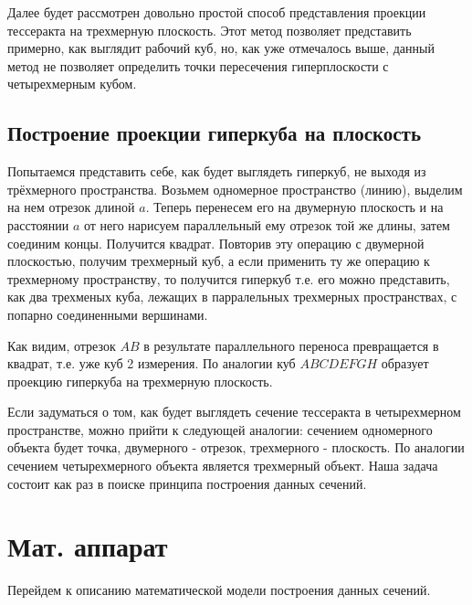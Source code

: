 \documentclass[12pt, a4paper, twoside]{report}
\begin{document}
Далее будет рассмотрен довольно простой способ представления проекции тессеракта на трехмерную плоскость. Этот метод позволяет представить примерно, как выглядит рабочий куб, но, как уже отмечалось выше, данный метод не позволяет определить точки пересечения гиперплоскости с четырехмерным кубом.
\subsection{Построение проекции гиперкуба на плоскость}
Попытаемся представить себе, как будет выглядеть гиперкуб, не выходя из трёхмерного пространства. Возьмем одномерное пространство (линию), выделим на нем отрезок длиной $a$. Теперь перенесем его на двумерную плоскость и на расстоянии $a$ от него нарисуем параллельный ему отрезок той же длины, затем соединим концы. Получится квадрат. Повторив эту операцию с двумерной плоскостью, получим трехмерный куб, а если применить ту же операцию к трехмерному пространству, то получится гиперкуб т.е. его можно представить, как два трехменых куба, лежащих в парралельных трехмерных пространствах, с попарно соединенными вершинами. 

\begin{figure}[h!]
	\clearpage
\end{figure}

Как видим, отрезок $AB$ в результате параллельного переноса превращается в квадрат, т.е. уже куб 2 измерения. По аналогии куб $ABCDEFGH$ образует проекцию гиперкуба на трехмерную плоскость.

Если задуматься о том, как будет выглядеть сечение тессеракта в четырехмерном пространстве, можно прийти к следующей аналогии: сечением одномерного объекта будет точка, двумерного -  отрезок, трехмерного - плоскость. По аналогии сечением четырехмерного объекта является трехмерный объект. Наша задача состоит как раз в поиске принципа построения данных сечений.

\section{Мат. аппарат}
Перейдем к описанию математической модели построения данных сечений.
\end{document}
